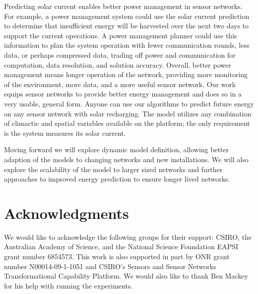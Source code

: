 \documentclass[prodmode,acmtosn]{acmsmall}
\begin{document}
Predicting solar current enables better power management in sensor networks.
For example, a power management system could use the solar current prediction to determine that insufficient energy will be harvested over the next two days to support the current operations.
A power management planner could use this information to plan the system operation with fewer communication rounds, less data, or perhaps compressed data, trading off power and communication for computation, data resolution, and solution accuracy.
Overall, better power management means longer operation of the network, providing more monitoring of the environment, more data, and a more useful sensor network.
Our work equips sensor networks to provide better energy management and does so in a very usable, general form. 
Anyone can use our algorithms to predict future energy on any sensor network with solar recharging.
The model utilizes any combination of climactic and spatial variables available on the platform; the only requirement is the system measures its solar current.

Moving forward we will explore dynamic model definition, allowing better adaption of the models to changing networks and new installations.
We will also explore the scalability of the model to larger sized networks and further approaches to improved energy prediction to ensure longer lived networks.

\section{Acknowledgments}
We would like to acknowledge the following groups for their support: CSIRO, the Australian Academy of Science, and the National Science Foundation EAPSI grant number 6854573.
This work is also supported in part by ONR grant number N00014-09-1-1051 and CSIRO's Sensors and Sensor Networks Transformational Capability Platform.
We would also like to thank Ben Mackey for his help with running the experiments.
\end{document}
